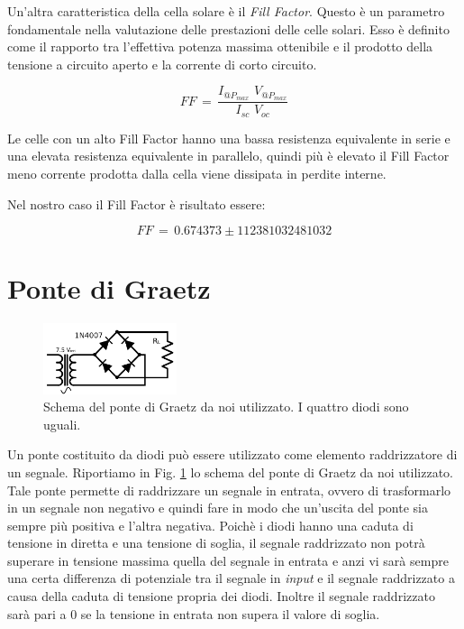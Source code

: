 Un'altra caratteristica della cella solare è il \emph{Fill Factor}. Questo è un parametro fondamentale nella valutazione delle prestazioni delle celle solari. Esso è definito come il rapporto tra l'effettiva potenza massima ottenibile e il prodotto della tensione a circuito aperto e la corrente di corto circuito.

\begin{equation}
FF \, = \, \frac{I_{@P_{max}} \,\, V_{@P_{max}}}{I_{sc} \,\, V_{oc}}
\label{eq:FF}
\end{equation}

Le celle con un alto Fill Factor hanno una bassa resistenza equivalente in serie e una elevata resistenza equivalente in parallelo, quindi più è elevato il Fill Factor meno corrente prodotta dalla cella viene dissipata in perdite interne.

Nel nostro caso il Fill Factor è risultato essere:

$$FF \,=\, 0.674373 \pm 112381032481032$$


\section{Ponte di Graetz}

\begin{figure}
	\includegraphics[width=0.35\textwidth]{schema_graetz.pdf}
	\caption{Schema del ponte di Graetz da noi utilizzato. I quattro diodi sono uguali.}
	\label{fig:graetz}
\end{figure}

Un ponte costituito da diodi può essere utilizzato come elemento raddrizzatore di un segnale. Riportiamo in Fig. \ref{fig:graetz} lo schema del ponte di Graetz da noi utilizzato. Tale ponte permette di raddrizzare un segnale in entrata, ovvero di trasformarlo in un segnale non negativo e quindi fare in modo che un'uscita del ponte sia sempre più positiva e l'altra negativa. Poichè i diodi hanno una caduta di tensione in diretta e una tensione di soglia, il segnale raddrizzato non potrà superare in tensione massima quella del segnale in entrata e anzi vi sarà sempre una certa differenza di potenziale tra il segnale in \emph{input} e il segnale raddrizzato a causa della caduta di tensione propria dei diodi.
Inoltre il segnale raddrizzato sarà pari a 0 se la tensione in entrata non supera il valore di soglia.

